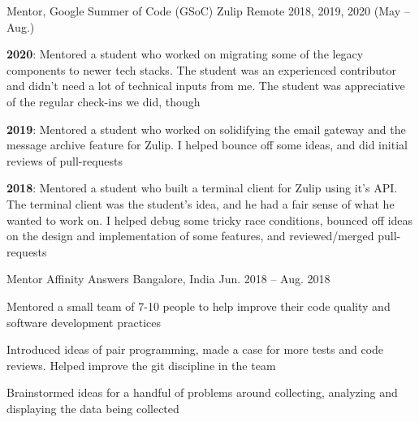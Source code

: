 
\begin{cventries}

  \cventry
      {Mentor, Google Summer of Code (GSoC) }
      {Zulip }
      {Remote} %
      {2018, 2019, 2020 (May -- Aug.)} %
      {
        \begin{cvitems} %
        \item {\textbf{2020}: Mentored a student who worked on migrating some of the legacy components to newer tech stacks. The student was an experienced contributor and didn't need a lot of technical inputs from me. The student was appreciative of the regular check-ins we did, though}
        \item {\textbf{2019}: Mentored a student who worked on solidifying the email gateway and the message archive feature for Zulip. I helped bounce off some ideas, and did initial reviews of pull-requests}
        \item {\textbf{2018}: Mentored a student who built a terminal client for Zulip using it's API. The terminal client was the student's idea, and he had a fair sense of what he wanted to work on. I helped debug some tricky race conditions, bounced off ideas on the design and implementation of some features, and reviewed/merged pull-requests}
        \end{cvitems}
      }
  \cventry
      {Mentor}
      {Affinity Answers }
      {Bangalore, India} %
      {Jun. 2018 -- Aug. 2018} %
      {
        \begin{cvitems} %
        \item {Mentored a small team of 7-10 people to help improve their code quality and software development practices}
        \item {Introduced ideas of pair programming, made a case for more tests and code reviews. Helped improve the git discipline in the team}
        \item {Brainstormed ideas for a handful of problems around collecting, analyzing and displaying the data being collected}
        \end{cvitems}
      }
\end{cventries}
